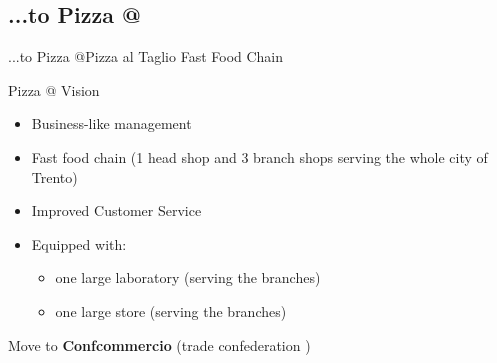 \documentclass{beamer}
\begin{document}
\subsection{...to Pizza @}
\begin{frame}{...to Pizza @}{Pizza al Taglio Fast Food Chain}
 \begin{block}{Pizza @ Vision}
 \begin{itemize}
  \item Business-like management
  \item Fast food chain (1 head shop and 3 branch shops serving the whole city of Trento)
  \item Improved Customer Service
  \item Equipped with:
  \begin{itemize}
   \item one large laboratory (serving the branches)
   \item one large store (serving the branches)
  \end{itemize}
 \end{itemize}
 \begin{center}
  Move to \textbf{Confcommercio} (trade confederation \textcopyright)
 \end{center}
 \end{block}
\end{frame}
\end{document}

